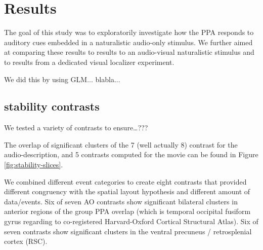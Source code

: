 \documentclass[english]{article}
\begin{document}
\section{Results}


The goal of this study was to exploratorily investigate how the PPA responds to
auditory cues embedded in a naturalistic audio-only stimulus. We further aimed
at comparing these results to results to an audio-visual naturalistic stimulus
and to results from a dedicated visual localizer experiment.

We did this by using GLM... blabla...


\subsection{stability contrasts}

We tested a variety of contrasts to ensure\dots ???

The overlap of significant clusters of the 7 (well actually 8) contrast for the
audio-description, and 5 contrasts computed for the movie can be found in Figure
\ref{fig:stability-slices}.

We combined different event categories to create eight contrasts that provided
different congruency with the spatial layout hypothesis and different amount of
data/events.
Six of seven AO contrasts show significant bilateral clusters in anterior
regions of the group PPA overlap (which is temporal occipital fusiform gyrus
regarding to co-registered Harvard-Oxford Cortical Structural Atlas).
Six of seven contrasts show significant clusters in the ventral precuneus /
retrosplenial cortex (RSC).
\end{document}
